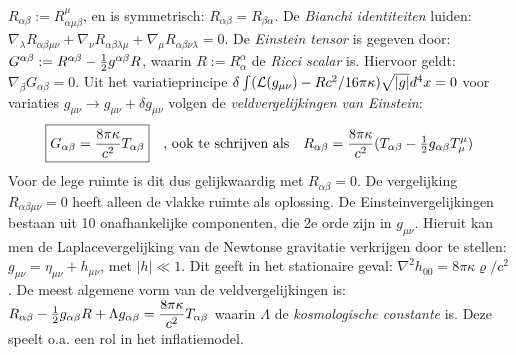 \documentclass[twoside]{report}
\begin{document}
$R_{\alpha\beta}:=R^\mu_{\alpha\mu\beta}$, en is symmetrisch:\linebreak
$R_{\alpha\beta}=R_{\beta\alpha}$. De {\it Bianchi identiteiten} luiden:
$\nabla_\lambda R_{\alpha\beta\mu\nu}+\nabla_\nu R_{\alpha\beta\lambda\mu}+
\nabla_\mu R_{\alpha\beta\nu\lambda}=0$.
\npar
De {\it Einstein tensor} is gegeven door:
$G^{\alpha\beta}:=R^{\alpha\beta}-\mbox{$\frac{1}{2}$} g^{\alpha\beta}R$, waarin
$R:=R_\alpha^\alpha$ de {\it Ricci scalar} is. Hiervoor geldt:
$\nabla_\beta G_{\alpha\beta}=0$. Uit het variatieprincipe
$\delta\int({\cal L}(g_{\mu\nu})-Rc^2/16\pi\kappa)\sqrt{|g|}d^4x=0$ voor variaties
$g_{\mu\nu}\rightarrow g_{\mu\nu}+\delta g_{\mu\nu}$ volgen de
{\it veldvergelijkingen van Einstein}:
\[
\mbox{\fbox{$\displaystyle
G_{\alpha\beta}=\frac{8\pi\kappa}{c^2}T_{\alpha\beta}
$}}
~~~\mbox{, ook te schrijven als}~~~
R_{\alpha\beta}=\frac{8\pi\kappa}{c^2}(T_{\alpha\beta}-\mbox{$\frac{1}{2}$} g_{\alpha\beta}T^{\mu}_{\mu})
\]
Voor de lege ruimte is dit dus gelijkwaardig met $R_{\alpha\beta}=0$. De
vergelijking $R_{\alpha\beta\mu\nu}=0$ heeft alleen de vlakke ruimte als
oplossing.
\npar
De Einsteinvergelijkingen bestaan uit 10 onafhankelijke componenten, die 2e
orde zijn in $g_{\mu\nu}$. Hieruit kan men de Laplacevergelijking van de
Newtonse gravitatie verkrijgen door te stellen:
$g_{\mu\nu}=\eta_{\mu\nu}+h_{\mu\nu}$, met $|h|\ll1$. Dit geeft in het
stationaire geval: $\nabla^2 h_{00}=8\pi\kappa\varrho/c^2$.
\npar
De meest algemene vorm van de veldvergelijkingen is:
$\displaystyle R_{\alpha\beta}-\mbox{$\frac{1}{2}$} g_{\alpha\beta}R+\Lambda g_{\alpha\beta}=\frac{8\pi\kappa}{c^2}T_{\alpha\beta}$
\npar
waarin $\Lambda$ de {\it kosmologische constante} is. Deze speelt o.a. een
rol in het inflatiemodel.
\end{document}
